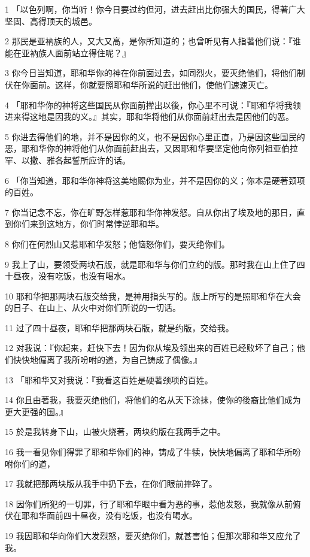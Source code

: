 \par 1 「以色列啊，你当听！你今日要过约但河，进去赶出比你强大的国民，得著广大坚固、高得顶天的城邑。
\par 2 那民是亚衲族的人，又大又高，是你所知道的；也曾听见有人指著他们说：『谁能在亚衲族人面前站立得住呢？』
\par 3 你今日当知道，耶和华你的神在你前面过去，如同烈火，要灭绝他们，将他们制伏在你面前。这样，你就要照耶和华所说的赶出他们，使他们速速灭亡。
\par 4 「耶和华你的神将这些国民从你面前撵出以後，你心里不可说：『耶和华将我领进来得这地是因我的义。』其实，耶和华将他们从你面前赶出去是因他们的恶。
\par 5 你进去得他们的地，并不是因你的义，也不是因你心里正直，乃是因这些国民的恶，耶和华你的神将他们从你面前赶出去，又因耶和华要坚定他向你列祖亚伯拉罕、以撒、雅各起誓所应许的话。
\par 6 「你当知道，耶和华你神将这美地赐你为业，并不是因你的义；你本是硬著颈项的百姓。
\par 7 你当记念不忘，你在旷野怎样惹耶和华你神发怒。自从你出了埃及地的那日，直到你们来到这地方，你们时常悖逆耶和华。
\par 8 你们在何烈山又惹耶和华发怒；他恼怒你们，要灭绝你们。
\par 9 我上了山，要领受两块石版，就是耶和华与你们立约的版。那时我在山上住了四十昼夜，没有吃饭，也没有喝水。
\par 10 耶和华把那两块石版交给我，是神用指头写的。版上所写的是照耶和华在大会的日子、在山上、从火中对你们所说的一切话。
\par 11 过了四十昼夜，耶和华把那两块石版，就是约版，交给我。
\par 12 对我说：『你起来，赶快下去！因为你从埃及领出来的百姓已经败坏了自己；他们快快地偏离了我所吩咐的道，为自己铸成了偶像。』
\par 13 「耶和华又对我说：『我看这百姓是硬著颈项的百姓。
\par 14 你且由著我，我要灭绝他们，将他们的名从天下涂抹，使你的後裔比他们成为更大更强的国。』
\par 15 於是我转身下山，山被火烧著，两块约版在我两手之中。
\par 16 我一看见你们得罪了耶和华你们的神，铸成了牛犊，快快地偏离了耶和华所吩咐你们的道，
\par 17 我就把那两块版从我手中扔下去，在你们眼前摔碎了。
\par 18 因你们所犯的一切罪，行了耶和华眼中看为恶的事，惹他发怒，我就像从前俯伏在耶和华面前四十昼夜，没有吃饭，也没有喝水。
\par 19 我因耶和华向你们大发烈怒，要灭绝你们，就甚害怕；但那次耶和华又应允了我。
